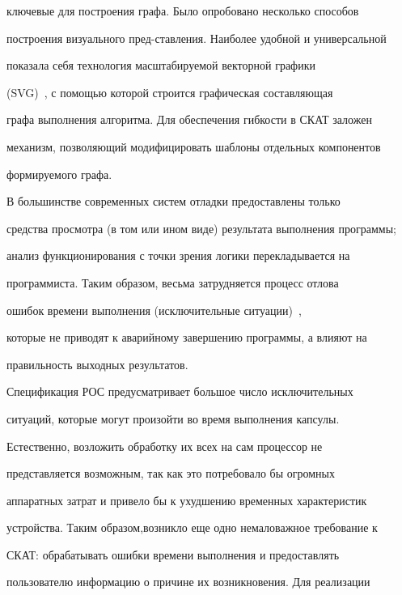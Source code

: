 ключевые для построения графа. Было опробовано несколько способов 


построения визуального пред-\linebreak став\-ле\-ния. Наиболее удобной и универсальной 


показала себя технология масштабируемой векторной графики 


(SVG)~\cite{10-2}, с по\-мощью которой строится графическая составляющая 


графа выполнения алгоритма. Для обеспечения гибкости в СКАТ заложен 


механизм, позволяющий модифицировать шаблоны отдельных компонентов 


формируемого графа.


      


      В большинстве современных систем отладки предоставлены только 


средства просмотра (в том или ином виде) результата выполнения программы; 


анализ функционирования с точки зрения логики перекладывается на 


программиста. Таким образом, весьма затрудняется процесс отлова 


ошибок времени выполнения (исключительные ситуации)~\cite{11-2}, 


которые не приводят к аварийному завершению программы, а влияют на 


правильность выходных результатов.


      


      Спецификация РОС предусматривает большое число ис\-клю\-чи\-тель\-ных 


ситуаций, которые могут произойти во время выполнения капсулы. 


Естественно, возложить обработку их всех на сам процессор не 


представляется возможным, так как это потребовало бы огромных 


аппаратных затрат и привело бы к ухудшению временных характеристик 


устройства. Таким образом,\linebreak возникло еще одно немаловажное требование к 


СКАТ: обрабатывать ошибки времени выполнения и предоставлять 


пользователю информацию о причине их возникновения. Для реализации 


